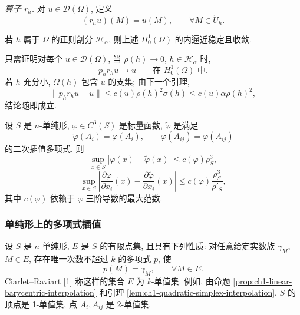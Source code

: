 \emph{算子 $r_h$.} 对 $u\in\mathcal D(\Omega)$, 定义
\begin{equation}
(r_hu)(M)=u(M),\qquad\forall M\in\mathring U_h.
\label{eq:ch1-quadratic-restriction}
\end{equation}

\begin{Proposition}
\label{prop:ch1-quadratic-h01-convergence}
若 $h$ 属于 $\Omega$ 的正则剖分 $\mathcal H_\alpha$, 则上述 $H_0^1(\Omega)$ 的内逼近稳定且收敛.
\end{Proposition}

\begin{Proof}
只需证明对每个 $u\in\mathcal D(\Omega)$, 当 $\rho(h)\to0$, $h\in\mathcal H_\alpha$ 时,
\[
p_hr_hu\to u\qquad\text{在 }H_0^1(\Omega)\text{ 中}.
\]
若 $h$ 充分小, $\Omega(h)$ 包含 $u$ 的支集; 由下一个引理,
\begin{equation}
\|p_hr_hu-u\|
\leq c(u)\rho(h)^2\sigma(h)
\leq c(u)\alpha\rho(h)^2,
\label{eq:ch1-quadratic-global-error}
\end{equation}
结论随即成立.
\end{Proof}

\begin{Lemma}
\label{lem:ch1-quadratic-interpolation-error}
设 $S$ 是 $n$-单纯形, $\varphi\in C^3(S)$ 是标量函数, $\widetilde\varphi$ 是满足
\[
\widetilde\varphi(A_i)=\varphi(A_i),\qquad
\widetilde\varphi(A_{ij})=\varphi(A_{ij})
\]
的二次插值多项式. 则
\begin{equation}
\sup_{x\in S}|\varphi(x)-\widetilde\varphi(x)|
\leq c(\varphi)\rho_S^3,
\label{eq:ch1-quadratic-value-error}
\end{equation}
\begin{equation}
\sup_{x\in S}
\left|\frac{\partial\varphi}{\partial x_i}(x)
-\frac{\partial\widetilde\varphi}{\partial x_i}(x)\right|
\leq c(\varphi)\frac{\rho_S^3}{\rho'_S},
\label{eq:ch1-quadratic-derivative-error}
\end{equation}
其中 $c(\varphi)$ 依赖于 $\varphi$ 三阶导数的最大范数.
\end{Lemma}

\subsubsection*{单纯形上的多项式插值}

设 $S$ 是 $n$-单纯形, $E$ 是 $S$ 的有限点集, 且具有下列性质: 对任意给定实数族 $\gamma_M$, $M\in E$, 存在唯一次数不超过 $k$ 的多项式 $p$, 使
\begin{equation}
p(M)=\gamma_M,\qquad\forall M\in E.
\label{eq:ch1-k-unisolvent-data}
\end{equation}
Ciarlet--Raviart [1] 称这样的集合 $E$ 为 $k$-单值集. 例如, 由命题 \ref{prop:ch1-linear-barycentric-interpolation} 和引理 \ref{lem:ch1-quadratic-simplex-interpolation}, $S$ 的顶点是 1-单值集, 点 $A_i,A_{ij}$ 是 2-单值集.

